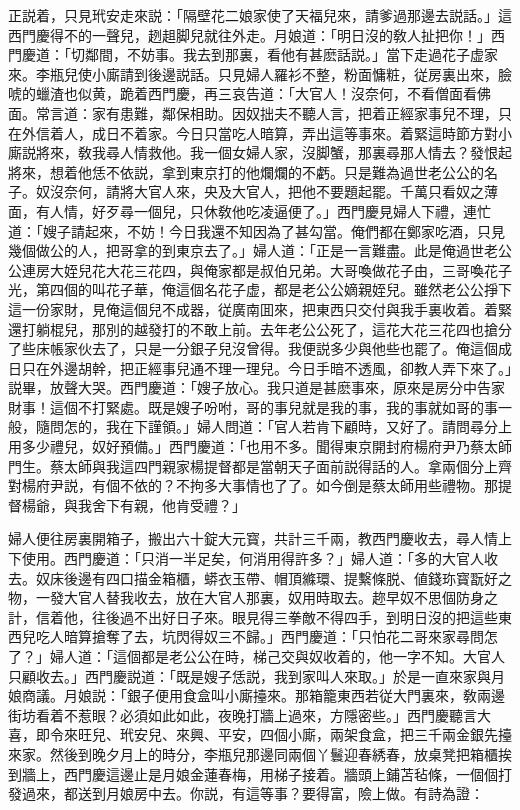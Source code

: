 正説着，只見玳安走來説：「隔壁花二娘家使了天福兒來，請爹過那邊去説話。」這西門慶得不的一聲兒，趔趄脚兒就往外走。月娘道：「明日沒的敎人扯把你！」西門慶道：「切鄰間，不妨事。我去到那裏，看他有甚麽話説。」當下走過花子虚家來。李瓶兒使小廝請到後邊説話。只見婦人羅衫不整，粉面慵粧，従房裏出來，臉唬的蠟渣也似黄，跪着西門慶，再三哀告道：「大官人！沒奈何，不看僧面看佛面。常言道：家有患難，鄰保相助。因奴拙夫不聽人言，把着正經家事兒不理，只在外信着人，成日不着家。今日只當吃人暗算，弄出這等事來。着緊這時節方對小廝説將來，敎我尋人情救他。我一個女婦人家，沒脚蟹，那裏尋那人情去？發恨起將來，想着他恁不依説，拿到東京打的他爛爛的不虧。只是難為過世老公公的名子。奴沒奈何，請將大官人來，央及大官人，把他不要題起罷。千萬只看奴之薄面，有人情，好歹尋一個兒，只休敎他吃凌逼便了。」西門慶見婦人下禮，連忙道：「嫂子請起來，不妨！今日我還不知因為了甚勾當。俺們都在鄭家吃酒，只見幾個做公的人，把哥拿的到東京去了。」婦人道：「正是一言難盡。此是俺過世老公公連房大姪兒花大花三花四，與俺家都是叔伯兄弟。大哥喚做花子由，三哥喚花子光，第四個的叫花子華，俺這個名花子虚，都是老公公嫡親姪兒。雖然老公公掙下這一份家財，見俺這個兒不成器，従廣南囬來，把東西只交付與我手裏收着。着緊還打躺棍兒，那別的越發打的不敢上前。去年老公公死了，這花大花三花四也搶分了些床帳家伙去了，只是一分銀子兒沒曾得。我便説多少與他些也罷了。俺這個成日只在外邊胡幹，把正經事兒通不理一理兒。今日手暗不透風，卻教人弄下來了。」説畢，放聲大哭。西門慶道：「嫂子放心。我只道是甚麽事來，原來是房分中告家財事！這個不打緊處。既是嫂子吩咐，哥的事兒就是我的事，我的事就如哥的事一般，隨問怎的，我在下謹領。」婦人問道：「官人若肯下顧時，又好了。請問尋分上用多少禮兒，奴好預備。」西門慶道：「也用不多。聞得東京開封府楊府尹乃蔡太師門生。蔡太師與我這四門親家楊提督都是當朝天子面前説得話的人。拿兩個分上齊對楊府尹説，有個不依的？不拘多大事情也了了。如今倒是蔡太師用些禮物。那提督楊爺，與我舍下有親，他肯受禮？」

婦人便往房裏開箱子，搬出六十錠大元寳，共計三千兩，教西門慶收去，尋人情上下使用。西門慶道：「只消一半足矣，何消用得許多？」婦人道：「多的大官人收去。奴床後邊有四口描金箱櫃，蟒衣玉帶、帽頂縧環、提繫條脱、値錢珎寳翫好之物，一發大官人替我收去，放在大官人那裏，奴用時取去。趂早奴不思個防身之計，信着他，往後過不出好日子來。眼見得三拳敵不得四手，到明日沒的把這些東西兒吃人暗算搶奪了去，坑閃得奴三不歸。」西門慶道：「只怕花二哥來家尋問怎了？」婦人道：「這個都是老公公在時，梯己交與奴收着的，他一字不知。大官人只顧收去。」西門慶説道：「既是嫂子恁説，我到家叫人來取。」於是一直來家與月娘商議。月娘説：「銀子便用食盒叫小廝擡來。那箱籠東西若従大門裏來，敎兩邊街坊看着不惹眼？必須如此如此，夜晚打牆上過來，方隱密些。」西門慶聽言大喜，即令來旺兒、玳安兒、來興、平安，四個小廝，兩架食盒，把三千兩金銀先擡來家。然後到晚夕月上的時分，李瓶兒那邊同兩個丫鬟迎春綉春，放桌凳把箱櫃挨到牆上，西門慶這邊止是月娘金蓮春梅，用梯子接着。牆頭上鋪苫毡條，一個個打發過來，都送到月娘房中去。你説，有這等事？要得富，險上做。有詩為證：

